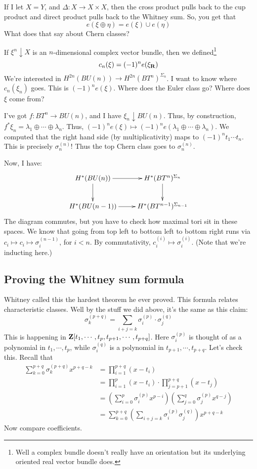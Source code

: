 If I let $X=Y$, and $\Delta:X\to X\times X$, then the cross product pulls back to the cup product and direct product pulls back to the Whitney sum.
So, you get that
$$e(\xi\oplus\eta) = e(\xi)\cup e(\eta)$$
What does that say about Chern classes?

If $\xi^n\downarrow X$ is an $n$-dimensional complex vector bundle, then we defined\footnote{Well a complex bundle doesn't really have an orientation but its underlying oriented real vector bundle does.}
$$
c_n(\xi) = (-1)^n e(\xi_\mathbf R)
$$
We're interested in $H^{2n}(BU(n)) \to H^{2n}(BT^n)^{\Sigma_n}$.
I want to know where $c_n(\xi_n)$ goes.
This is $(-1)^ne(\xi)$.
Where does the Euler class go?
Where does $\xi$ come from?

I've got $f:BT^n\to BU(n)$, and I have $\xi_n\downarrow BU(n)$.
Thus, by construction, $f^\ast\xi_n = \lambda_1\oplus\cdots\oplus \lambda_n$.
Thus, $(-1)^ne(\xi)\mapsto (-1)^n e(\lambda_1\oplus\cdots\oplus \lambda_n)$.
We computed that the right hand side (by multiplicativity) maps to $(-1)^nt_1\cdots t_n$.
This is precisely $\sigma_n^{(n)}$!
Thus the top Chern class goes to $\sigma_n^{(n)}$.

Now, I have:
\begin{equation*}
    \xymatrix{
	H^\ast(BU(n)) \ar[r] \ar[d] & H^\ast(BT^n)^{\Sigma_n}\ar[d]\\
	H^\ast(BU(n-1)) \ar[r] & H^\ast(BT^{n-1})^{\Sigma_{n-1}}
    }
\end{equation*}
The diagram commutes, but you have to check how maximal tori sit in these spaces.
We know that going from top left to bottom left to bottom right runs via $c_i\mapsto c_i\mapsto \sigma_i^{(n-1)}$, for $i<n$.
By commutativity, $c_i^{(i)}\mapsto \sigma_i^{(i)}$.
(Note that we're inducting here.)
\subsection{Proving the Whitney sum formula}
Whitney called this the hardest theorem he ever proved.
This formula relates characteristic classes.
Well by the stuff we did above, it's the same as this claim:
$$
\sigma^{(p+q)}_k = \sum_{i+j=k}\sigma_i^{(p)}\cdot\sigma_j^{(q)}
$$
This is happening in $\mathbf Z[t_1,\cdots,t_p,t_{p+1},\cdots,t_{p+q}]$.
Here $\sigma_i^{(p)}$ is thought of as a polynomial in $t_1,\cdots,t_p$, while $\sigma_i^{(q)}$ is a polynomial in $t_{p+1},\cdots,t_{p+q}$.
Let's check this.
Recall that
\begin{align*}
    \sum_{k=0}^{p+q} \sigma_k^{(p+q)}x^{p+q-k} & = \prod^{p+q}_{i=1}(x-t_i)\\
    & = \prod^p_{i=1}(x-t_i)\cdot\prod^{p+q}_{j=p+1}(x-t_j)\\
    & = \left(\sum^p_{i=0}\sigma^{(p)}_i x^{p-i}\right)\left(\sum^q_{j=0}\sigma_j^{(p)} x^{q-j}\right)\\
    & = \sum^{p+q}_{k=0}\left(\sum_{i+j=k}\sigma_i^{(p)}\sigma_j^{(q)}\right)x^{p+q-k}
\end{align*}
Now compare coefficients.
